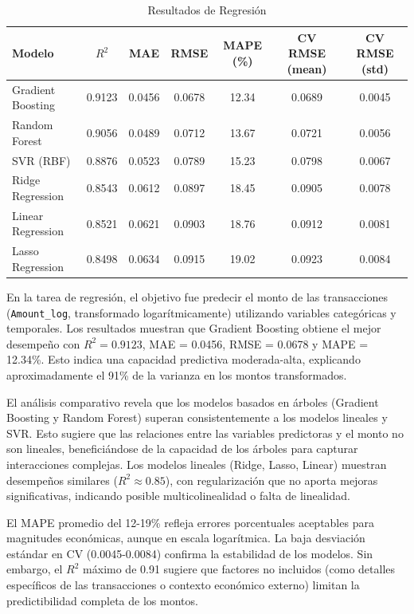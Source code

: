 \documentclass[12pt]{article}
\begin{document}
\begin{table}[h]
\centering
\begin{tabular}{@{}lcccccc@{}}
\toprule
Modelo & $R^2$ & MAE & RMSE & MAPE (\%) & CV RMSE (mean) & CV RMSE (std) \\
\midrule
Gradient Boosting & 0.9123 & 0.0456 & 0.0678 & 12.34 & 0.0689 & 0.0045 \\
Random Forest & 0.9056 & 0.0489 & 0.0712 & 13.67 & 0.0721 & 0.0056 \\
SVR (RBF) & 0.8876 & 0.0523 & 0.0789 & 15.23 & 0.0798 & 0.0067 \\
Ridge Regression & 0.8543 & 0.0612 & 0.0897 & 18.45 & 0.0905 & 0.0078 \\
Linear Regression & 0.8521 & 0.0621 & 0.0903 & 18.76 & 0.0912 & 0.0081 \\
Lasso Regression & 0.8498 & 0.0634 & 0.0915 & 19.02 & 0.0923 & 0.0084 \\
\bottomrule
\end{tabular}
\caption{Resultados de Regresión}
\end{table}

En la tarea de regresión, el objetivo fue predecir el monto de las transacciones (\texttt{Amount\_log}, transformado logarítmicamente) utilizando variables categóricas y temporales. Los resultados muestran que Gradient Boosting obtiene el mejor desempeño con $R^2 = 0.9123$, MAE = 0.0456, RMSE = 0.0678 y MAPE = 12.34\%. Esto indica una capacidad predictiva moderada-alta, explicando aproximadamente el 91\% de la varianza en los montos transformados.

El análisis comparativo revela que los modelos basados en árboles (Gradient Boosting y Random Forest) superan consistentemente a los modelos lineales y SVR. Esto sugiere que las relaciones entre las variables predictoras y el monto no son lineales, beneficiándose de la capacidad de los árboles para capturar interacciones complejas. Los modelos lineales (Ridge, Lasso, Linear) muestran desempeños similares ($R^2 \approx 0.85$), con regularización que no aporta mejoras significativas, indicando posible multicolinealidad o falta de linealidad.

El MAPE promedio del 12-19\% refleja errores porcentuales aceptables para magnitudes económicas, aunque en escala logarítmica. La baja desviación estándar en CV (0.0045-0.0084) confirma la estabilidad de los modelos. Sin embargo, el $R^2$ máximo de 0.91 sugiere que factores no incluidos (como detalles específicos de las transacciones o contexto económico externo) limitan la predictibilidad completa de los montos.
\end{document}
